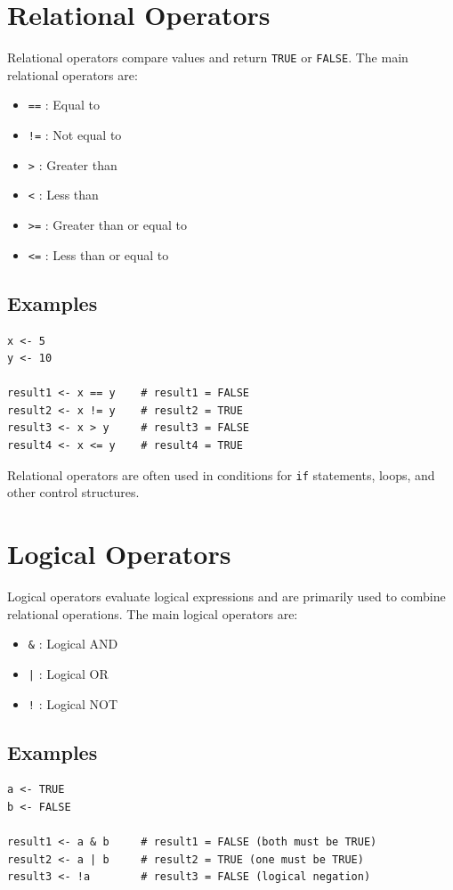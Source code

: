 \documentclass[12pt]{book}
\begin{document}
\section{Relational Operators}
Relational operators compare values and return \texttt{TRUE} or \texttt{FALSE}. The main relational operators are:
\begin{itemize}
    \item \texttt{==} : Equal to
    \item \texttt{!=} : Not equal to
    \item \texttt{>} : Greater than
    \item \texttt{<} : Less than
    \item \texttt{>=} : Greater than or equal to
    \item \texttt{<=} : Less than or equal to
\end{itemize}

\subsection{Examples}
\begin{verbatim}
x <- 5
y <- 10

result1 <- x == y    # result1 = FALSE
result2 <- x != y    # result2 = TRUE
result3 <- x > y     # result3 = FALSE
result4 <- x <= y    # result4 = TRUE
\end{verbatim}

Relational operators are often used in conditions for \texttt{if} statements, loops, and other control structures.

\section{Logical Operators}
Logical operators evaluate logical expressions and are primarily used to combine relational operations. The main logical operators are:
\begin{itemize}
    \item \texttt{\&} : Logical AND
    \item \texttt{|} : Logical OR
    \item \texttt{!} : Logical NOT
\end{itemize}

\subsection{Examples}
\begin{verbatim}
a <- TRUE
b <- FALSE

result1 <- a & b     # result1 = FALSE (both must be TRUE)
result2 <- a | b     # result2 = TRUE (one must be TRUE)
result3 <- !a        # result3 = FALSE (logical negation)
\end{verbatim}
\end{document}
